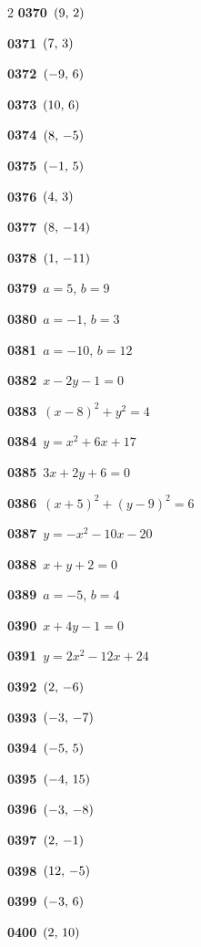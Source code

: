 \documentclass[10pt,a4paper]{article}
\begin{document}
\begin{multicols}{2}
\noindent\textbf{0370}\ $(9,\mkern3mu 2)$\par
\noindent\textbf{0371}\ $(7,\mkern3mu 3)$\par
\noindent\textbf{0372}\ $(-9,\mkern3mu 6)$\par
\noindent\textbf{0373}\ $(10,\mkern3mu 6)$\par
\noindent\textbf{0374}\ $(8,\mkern3mu -5)$\par
\noindent\textbf{0375}\ $(-1,\mkern3mu 5)$\par
\noindent\textbf{0376}\ $(4,\mkern3mu 3)$\par
\noindent\textbf{0377}\ $(8,\mkern3mu -14)$\par
\noindent\textbf{0378}\ $(1,\mkern3mu -11)$\par
\noindent\textbf{0379}\ $a=5$, $b=9$\par
\noindent\textbf{0380}\ $a=-1$, $b=3$\par
\noindent\textbf{0381}\ $a=-10$, $b=12$\par
\noindent\textbf{0382}\ $x-2y-1=0$\par
\noindent\textbf{0383}\ $(x-8)^2+y^2=4$\par
\noindent\textbf{0384}\ $y=x^2+6x+17$\par
\noindent\textbf{0385}\ $3x+2y+6=0$\par
\noindent\textbf{0386}\ $(x+5)^2+(y-9)^2=6$\par
\noindent\textbf{0387}\ $y=-x^2-10x-20$\par
\noindent\textbf{0388}\ $x+y+2=0$\par
\noindent\textbf{0389}\ $a=-5$, $b=4$\par
\noindent\textbf{0390}\ $x+4y-1=0$\par
\noindent\textbf{0391}\ $y=2x^2-12x+24$\par
\noindent\textbf{0392}\ $(2,\mkern3mu -6)$\par
\noindent\textbf{0393}\ $(-3,\mkern3mu -7)$\par
\noindent\textbf{0394}\ $(-5,\mkern3mu 5)$\par
\noindent\textbf{0395}\ $(-4,\mkern3mu 15)$\par
\noindent\textbf{0396}\ $(-3,\mkern3mu -8)$\par
\noindent\textbf{0397}\ $(2,\mkern3mu -1)$\par
\noindent\textbf{0398}\ $(12,\mkern3mu -5)$\par
\noindent\textbf{0399}\ $(-3,\mkern3mu 6)$\par
\noindent\textbf{0400}\ $(2,\mkern3mu 10)$\par

\end{multicols}
\end{document}
